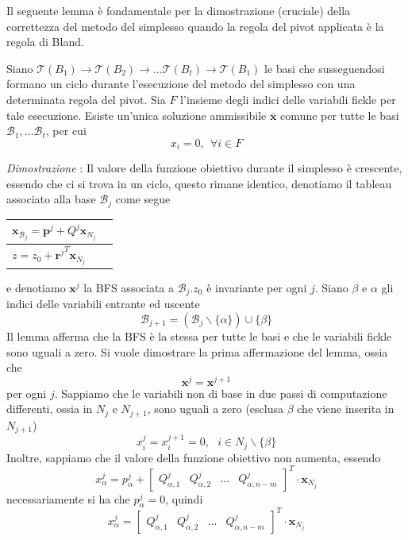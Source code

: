 \documentclass[10pt, letterpaper]{report}
\begin{document}
Il seguente lemma è fondamentale per la dimostrazione (cruciale) della correttezza del metodo del simplesso quando la regola del pivot applicata è la regola di Bland.
\begin{lemma2}\label{lemma_fickle}
    Siano $\mathcal  T(B_1)\rightarrow\mathcal  T(B_2)\rightarrow\dots \mathcal  T(B_t)\rightarrow \mathcal  T(B_1)$ le basi che susseguendosi formano un ciclo durante l'esecuzione del metodo del simplesso con una determinata regola del pivot. Sia $F$ l'insieme degli indici delle variabili fickle per tale esecuzione. Esiste un'unica soluzione ammissibile $\bar{\mathbf x}$ comune per tutte le basi $\mathcal B_1,\dots \mathcal B_t$, per cui $$ x_i=0, \ \ \forall i\in F$$
\end{lemma2}
\textit{Dimostrazione} : Il valore della funzione obiettivo durante il simplesso è crescente, essendo che ci si trova in un ciclo, questo rimane identico, denotiamo il tableau associato alla base $\mathcal B_j$ come segue 
\begin{center}
    \begin{tabular}{|l|l|}\hline 
       $\mathbf{x}_{\mathcal{B}_j} = \mathbf p^j + Q^j\mathbf x_{N_j}$\\ \hline 
       $z=z_0+{\mathbf{r}^j}^T\mathbf x_{N_j}$ \\\hline 
    \end{tabular}
\end{center}
e denotiamo ${\mathbf x}^{j}$ la BFS associata a $\mathcal B_j$.$z_0$ è invariante per ogni $j$. Siano $\beta$ e $\alpha$ gli indici delle variabili entrante ed uscente 
$$ \mathcal B_{j+1}=(\mathcal B_j \backslash \{\alpha\})\cup\{\beta\}$$
Il lemma afferma che la BFS è la stessa per tutte le basi e che le variabili fickle sono uguali a zero. Si vuole dimostrare la prima affermazione del lemma, ossia che $${\mathbf x}^{j}={\mathbf x}^{j+1}$$
per ogni $j$. Sappiamo che le variabili non di base  in due passi di computazione differenti, ossia in $N_j$ e $N_{j+1}$, sono uguali a zero (esclusa $\beta$ che viene inserita in $N_{j+1}$) 
$$ x_i^{j}=x_i^{j+1}=0, \ \ \ i\in N_j\backslash\{\beta\}$$
Inoltre, sappiamo che il valore della funzione obiettivo non aumenta, essendo 
$$ x^j_\alpha = p_\alpha^j+\begin{bmatrix}
    Q^j_{\alpha,1}& Q^j_{\alpha,2}& \dots & Q^j_{\alpha,n-m}
\end{bmatrix}^T\cdot \mathbf x_{N_j}$$
necessariamente si ha che $p_\alpha^j=0 $, quindi $$ x^j_\alpha = \begin{bmatrix}
    Q^j_{\alpha,1}& Q^j_{\alpha,2}& \dots & Q^j_{\alpha,n-m}
\end{bmatrix}^T\cdot \mathbf x_{N_j}$$
\end{document}
